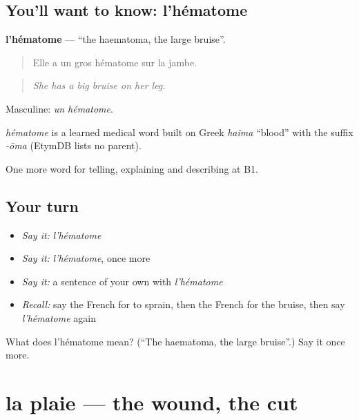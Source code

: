 \subsection*{You'll want to know: l'hématome}
\textbf{l'hématome} — \textquotedblleft{}the haematoma, the large bruise\textquotedblright{}.

\begin{quote}
Elle a un gros hématome sur la jambe.
\end{quote}

\begin{quote}
\emph{She has a big bruise on her leg.}
\end{quote}

Masculine: \emph{un hématome}.

\begin{cousinweb}
\emph{hématome} is a learned medical word built on Greek \emph{haîma} \textquotedblleft{}blood\textquotedblright{} with the suffix \emph{-ōma} (EtymDB lists no parent).
\end{cousinweb}

\begin{grammarlens}[title={What you've built}]
One more word for telling, explaining and describing at B1.
\end{grammarlens}

\subsection*{Your turn}
\begin{itemize}
\raggedright
  \item \emph{Say it:} \emph{l'hématome}
  \item \emph{Say it:} \emph{l'hématome}, once more
  \item \emph{Say it:} a sentence of your own with \emph{l'hématome}
  \item \emph{Recall:} say the French for to sprain, then the French for the bruise, then say \emph{l'hématome} again
\end{itemize}

\begin{tcolorbox}[breakable,colback=teal!4,colframe=teal!35!black,title={Before you move on}]
What does l'hématome mean? (\textquotedblleft{}The haematoma, the large bruise\textquotedblright{}.) Say it once more.
\end{tcolorbox}
\section[la plaie]{la plaie — the wound, the cut}

